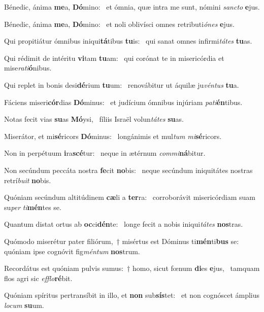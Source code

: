 \item Bénedic, ánima \textbf{me}a, \textbf{Dó}mino:~\psstar{} et ómnia, quæ intra me sunt, nómini \textit{sancto} \textbf{e}jus.
\item Bénedic, ánima \textbf{me}a, \textbf{Dó}mino:~\psstar{} et noli oblivísci omnes retributi\textit{ónes} \textbf{e}jus.
\item Qui propitiátur ómnibus iniqui\textbf{tá}tibus \textbf{tu}is:~\psstar{} qui sanat omnes infirmi\textit{tátes} \textbf{tu}as.
\item Qui rédimit de intéritu \textbf{vi}tam \textbf{tu}am:~\psstar{} qui corónat te in misericórdia et mise\textit{rati}\textbf{ó}nibus.
\item Qui replet in bonis desi\textbf{dé}rium \textbf{tu}um:~\psstar{} renovábitur ut áquilæ ju\textit{véntus} \textbf{tu}a.
\item Fáciens miseri\textbf{cór}dias \textbf{Dó}minus:~\psstar{} et judícium ómnibus injúriam \textit{pati}\textbf{én}tibus.
\item Notas fecit vias \textbf{su}as \textbf{Mó}ysi,~\psstar{} fíliis Israël volun\textit{tátes} \textbf{su}as.
\item Miserátor, et mi\textbf{sé}ricors \textbf{Dó}minus:~\psstar{} longánimis et mul\textit{tum} \textit{mi}\textbf{sé}ricors.
\item Non in perpétuum \textbf{i}ra\textbf{scé}tur:~\psstar{} neque in ætérnum \textit{commi}\textbf{ná}bi\-tur.
\item Non secúndum peccáta nostra \textbf{fe}cit \textbf{no}bis:~\psstar{} neque secúndum iniquitátes nostras retrí\textit{buit} \textbf{no}bis.
\item Quóniam secúndum altitúdinem \textbf{cæ}li a \textbf{ter}ra:~\psstar{} corroborávit misericórdiam suam su\textit{per} \textit{ti}\textbf{mén}tes se.
\item Quantum distat ortus ab \textbf{oc}ci\textbf{dén}te:~\psstar{} longe fecit a nobis iniqui\textit{tátes} \textbf{nos}tras.
\item Quómodo miserétur pater filiórum,~† misértus est Dóminus ti\textbf{mén}ti\textbf{bus} se:~\psstar{} quóniam ipse cognóvit fig\textit{méntum} \textbf{nos}trum.
\item Recordátus est quóniam pulvis sumus:~† homo, sicut fœnum \textbf{di}es \textbf{e}jus,~\psstar{} tamquam flos agri sic \textit{efflo}\textbf{ré}bit.
\item Quóniam spíritus pertransíbit in illo, et \textbf{non} sub\textbf{sís}tet:~\psstar{} et non cognóscet ámplius \textit{locum} \textbf{su}um.

